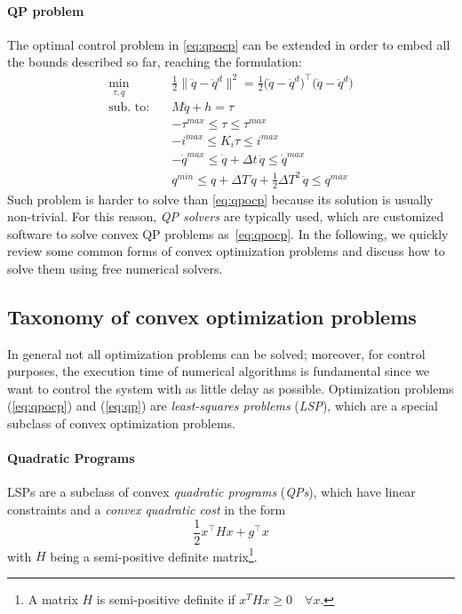 	
	\paragraph{QP problem} 
	The optimal control problem in \eqref{eq:qpocp} can be extended in order to embed all the bounds described so far, reaching the formulation:
	\begin{equation} \label{eq:qp}
		\begin{split}
			\min_{\tau, \ddot q}\quad & \frac 1 2 \big\|\ddot q - \ddot q^d \big\|^2 = \frac 1 2 \big(\ddot q - \ddot q^d\big)^\top \big(\ddot q - \ddot q^d\big) \\
			\textrm{sub. to:}\quad & M \ddot q + h = \tau \\
			& -\tau^{max} \leq \tau \leq \tau^{max} \\
			& -i^{max} \leq K_i \tau \leq i^{max} \\
			& -\dot q^{max} \leq \dot q + \Delta t \, \ddot q \leq \dot q^{max} \\
			& q^{min} \leq q + \Delta T\, \dot q + \frac 1 2 \Delta T^2 \, \ddot q \leq q^{max}
		\end{split}
	\end{equation}
	Such problem is harder to solve than \eqref{eq:qpocp} because its solution is usually non-trivial. 
	For this reason, \textit{QP solvers} are typically used, which are customized software to solve convex QP problems as~\eqref{eq:qpocp}.
	In the following, we quickly review some common forms of convex optimization problems and discuss how to solve them using free numerical solvers.
	
\subsection{Taxonomy of convex optimization problems} \label{sec:qp}
	In general not all optimization problems can be solved; moreover, for control purposes, the execution time of numerical algorithms is fundamental since we want to control the system with as little delay as possible.
	Optimization problems (\ref{eq:qpocp}) and (\ref{eq:qp}) are \textit{least-squares problems} (\textit{LSP}), which are a special subclass of convex optimization problems.
	
	\paragraph{Quadratic Programs}
	LSPs are a subclass of convex \textit{quadratic programs} (\textit{QPs}), which have linear constraints and a \textit{convex quadratic cost} in the form
	\begin{equation} \label{eq:qp_cost}
	\frac 1 2 x^\top H x + g^\top x
	\end{equation}
	with $H$ being a semi-positive definite matrix\footnote{A matrix $H$ is semi-positive definite if $x^T H x \ge 0 \quad \forall x$.}.
	
